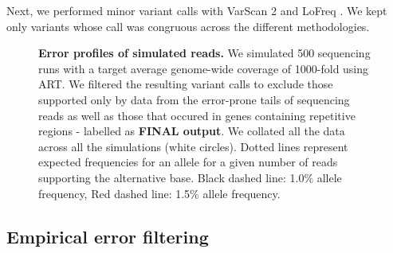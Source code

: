 \documentclass[12pt, oneside]{article}   	%
\begin{document}
\noindent Next, we performed minor variant calls with VarScan 2 \cite{varscan2} and LoFreq \cite{lofreq}. We kept only variants whose call was congruous across the different methodologies.

\begin{figure}
\label{fig:supfig2}
\centering
{}
\caption{\textbf{Error profiles of simulated reads.} We simulated 500 sequencing runs with a target average genome-wide coverage of 1000-fold using ART. We filtered the resulting variant calls to exclude those supported only by data from the error-prone tails of sequencing reads as well as those that occured in genes containing repetitive regions - labelled as \textbf{FINAL output}. We collated all the data across all the simulations (white circles). Dotted lines represent expected frequencies for an allele for a given number of reads supporting the alternative base. Black dashed line: 1.0\% allele frequency, Red dashed line: 1.5\% allele frequency.}
\end{figure}

\subsection{Empirical error filtering}
\end{document}
